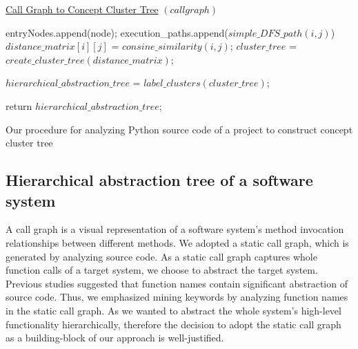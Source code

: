\begin{algorithm}
    
    \underline{Call Graph to Concept Cluster Tree} $(call graph)$\;
    
    {
        {
            entryNodes.append(node);
        }
    } 
    {
        {
            execution\_paths.append($simple\_DFS\_path(i, j)$)
        }
    }
    {
        {
            $distance\_matrix[i][j]$ = $consine\_similarity(i,j)$;
        }
    }
    $cluster\_tree$ = $create\_cluster\_tree(distance\_matrix)$;
    
    $hierarchical\_abstraction\_tree$ = $label\_clusters(cluster\_tree)$;
    
    return $hierarchical\_abstraction\_tree$;
    \caption{Our procedure for analyzing Python source code of a project to construct concept cluster tree}
    \label{alg:overall}
\end{algorithm}

\subsection{Hierarchical abstraction tree of a software system}
A call graph is a visual representation of a software system's method invocation relationships between different methods. We adopted a static call graph, which is generated by analyzing source code. As a static call graph captures whole function calls of a target system, we choose to abstract the target system. Previous studies suggested that function names contain significant abstraction of source code. 
Thus, we emphasized mining keywords by analyzing function names in the static call graph.
As we wanted to abstract the whole system's high-level functionality hierarchically, therefore the decision to adopt the static call graph as a building-block of our approach is well-justified.

